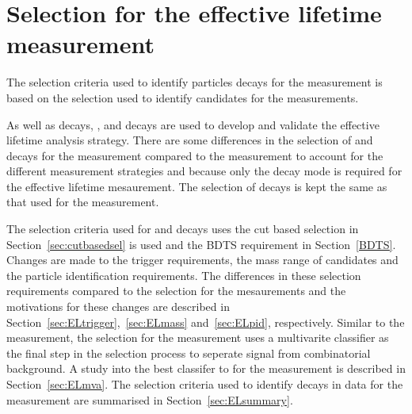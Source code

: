 \section{Selection for the effective lifetime measurement}
\label{sec:ELsel}



The selection criteria used to identify particles decays for the \el measurement is based on the selection used to identify candidates for the \BF measurements. 

As well as \bsmumu decays, \bdkpi, \bskk and \bsjpsiphi decays are used to develop and validate the effective lifetime analysis strategy. There are some differences in the selection of \bsmumu and \bhh decays for the \el measurement compared to the \BF measurement to account for the different measurement strategies and because only the \bs decay mode is required for the effective lifetime mesaurement. The selection of \bsjpsiphi decays is kept the same as that used for the \BF measurement.


The selection criteria used for \bsmumu and \bhh decays uses the cut based selection in Section~\ref{sec:cutbasedsel} is used and the BDTS requirement in Section~\ref{BDTS}. Changes are made to the trigger requirements, the mass range of \bsmumu candidates and the particle identification requirements. The differences in these selection requirements compared to the selection for the \BF mesaurements and the motivations for these changes are described in Section~\ref{sec:ELtrigger},~\ref{sec:ELmass} and~\ref{sec:ELpid}, respectively. 
Similar to the \BF measurement, the selection for the \el measurement uses a multivarite classifier as the final step in the selection process to seperate signal from combinatorial background. A study into the best classifer to for the \el measurement is described in Section~\ref{sec:ELmva}.
The selection criteria used to identify decays in data for the \bsmumu \el measurement are summarised in Section~\ref{sec:ELsummary}. 

